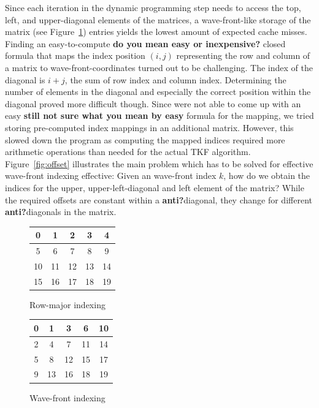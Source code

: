 \documentclass[runningheads,a4paper]{llncs}
\begin{document}
Since each iteration in the dynamic programming step needs to access the top, left, and upper-diagonal elements of the matrices, 
a wave-front-like storage of the matrix (see Figure~\ref{fig:wavefront}) entries yields the lowest amount of expected cache misses. 
Finding an easy-to-compute {\bf do you mean easy or inexpensive?} closed formula that maps the index position $(i,j)$ representing the row and column of a matrix 
to wave-front-coordinates turned out to be challenging. 
The index of the diagonal is $i+j$, the sum of row index and column index. 
Determining the number of elements in the diagonal and especially the correct position within the diagonal proved more difficult though.
Since were not able to come up with an easy {\bf still not sure what you mean by easy} formula for the mapping, 
we tried storing pre-computed index mappings in an additional matrix. 
However, this slowed down the program as computing the mapped indices required more arithmetic operations than needed for the actual TKF algorithm.
Figure~\ref{fig:offset} illustrates the main problem which has to be solved 
for effective wave-front indexing effective: Given an wave-front index $k$, how do we obtain the indices for the upper, upper-left-diagonal and left element of the matrix? 
While the required offsets are constant within a {\bf anti?}diagonal, they change for different {\bf anti?}diagonals in the matrix.

\begin{figure}

\begin{minipage}{0.5\textwidth}
\centering
\begin{tabular}{|c|c|c|c|c|}
\hline 
0 & 1 & 2 & 3 & 4 \\ 
\hline 
5 & 6 & 7 & 8 & 9 \\ 
\hline 
10 & 11 & 12 & 13 & 14 \\ 
\hline 
15 & 16 & 17 & 18 & 19 \\ 
\hline
\end{tabular}
\caption{Row-major indexing}
\label{fig:rowmajor}
\end{minipage}
\begin{minipage}{0.5\textwidth}
\centering
\begin{tabular}{|c|c|c|c|c|}
\hline 
0 & 1 & 3 & 6 & 10 \\ 
\hline 
2 & 4 & 7 & 11 & 14 \\ 
\hline 
5 & 8 & 12 & 15 & 17 \\ 
\hline 
9 & 13 & 16 & 18 & 19 \\ 
\hline 
\end{tabular}
\caption{Wave-front indexing}
\label{fig:wavefront}
\end{minipage}
\end{figure}
\end{document}
